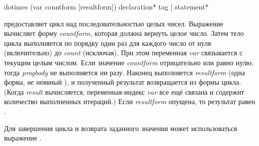 \begin{defmac}
dotimes (var countform [resultform])
        {declaration}* {tag | statement}*

 предоставляет цикл над последовательностью целых чисел.
Выражение
вычисляет форму \emph{countform}, которая должна вернуть целое число. Затем
тело цикла выполняется по порядку один раз для каждого число от нуля (включительно) до
\emph{count} (исключая). При этом переменная \emph{var} связывается с текущим
целым числом. Если значение \emph{countform} отрицательно или равно нулю, тогда
\emph{progbody} не выполняется ни разу. Наконец выполняется \emph{resultform} (одна форма,
\emph{не} неявный ), и полученный результат возвращается из формы
цикла.
(Когда \emph{result} вычисляется, переменная-индекс \emph{var} все ещё связана и
содержит количество выполненных итераций.)
Если \emph{resultform} опущена, то результат равен {\false}.

Для завершения цикла и возврата заданного значения может использоваться
выражение .


\end{defmac}
